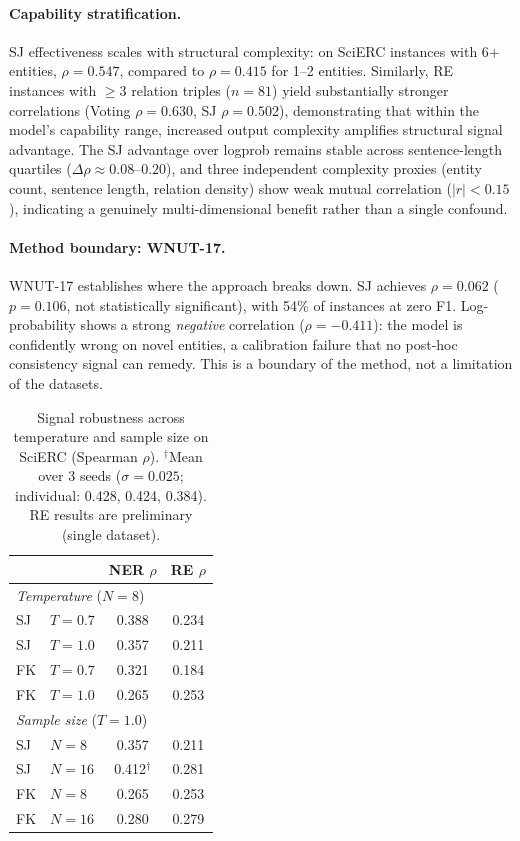 \paragraph{Capability stratification.}
SJ effectiveness scales with structural complexity: on SciERC instances with 6+ entities, $\rho{=}0.547$, compared to $\rho{=}0.415$ for 1--2 entities.
Similarly, RE instances with ${\geq}3$ relation triples ($n{=}81$) yield substantially stronger correlations (Voting $\rho{=}0.630$, SJ $\rho{=}0.502$), demonstrating that within the model's capability range, increased output complexity amplifies structural signal advantage.
The SJ advantage over logprob remains stable across sentence-length quartiles ($\Delta\rho{\approx}0.08$--$0.20$), and three independent complexity proxies (entity count, sentence length, relation density) show weak mutual correlation ($|r|{<}0.15$), indicating a genuinely multi-dimensional benefit rather than a single confound.

\paragraph{Method boundary: WNUT-17.}
WNUT-17 establishes where the approach breaks down.
SJ achieves $\rho{=}0.062$ ($p{=}0.106$, not statistically significant), with 54\% of instances at zero F1.
Log-probability shows a strong \textit{negative} correlation ($\rho{=}{-}0.411$): the model is confidently wrong on novel entities, a calibration failure that no post-hoc consistency signal can remedy.
This is a boundary of the method, not a limitation of the datasets.

\begin{table}[t]
\centering
\small
\caption{Signal robustness across temperature and sample size on SciERC (Spearman $\rho$). $^\dagger$Mean over 3 seeds ($\sigma{=}0.025$; individual: 0.428, 0.424, 0.384). RE results are preliminary (single dataset).}
\label{tab:robustness}
\begin{tabular}{llcc}
\toprule
& & NER $\rho$ & RE $\rho$ \\
\midrule
\multicolumn{4}{l}{\textit{Temperature} ($N{=}8$)} \\
\quad SJ & $T{=}0.7$ & 0.388 & 0.234 \\
\quad SJ & $T{=}1.0$ & 0.357 & 0.211 \\
\quad FK & $T{=}0.7$ & 0.321 & 0.184 \\
\quad FK & $T{=}1.0$ & 0.265 & 0.253 \\
\midrule
\multicolumn{4}{l}{\textit{Sample size} ($T{=}1.0$)} \\
\quad SJ & $N{=}8$  & 0.357 & 0.211 \\
\quad SJ & $N{=}16$ & 0.412$^\dagger$ & 0.281 \\
\quad FK & $N{=}8$  & 0.265 & 0.253 \\
\quad FK & $N{=}16$ & 0.280 & 0.279 \\
\bottomrule
\end{tabular}
\end{table}

